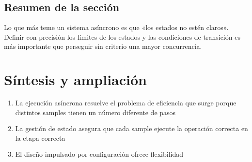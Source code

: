 \documentclass[a4paper]{article}
\begin{document}
\subsection{Resumen de la sección}
Lo que más teme un sistema asíncrono es que «los estados no estén claros». Definir con precisión los límites de los estados y las condiciones de transición es más importante que perseguir sin criterio una mayor concurrencia.

\newpage
\section{Síntesis y ampliación}
\begin{enumerate}
  \item La ejecución asíncrona resuelve el problema de eficiencia que surge porque distintos samples tienen un número diferente de pasos
  \item La gestión de estado asegura que cada sample ejecute la operación correcta en la etapa correcta
  \item El diseño impulsado por configuración ofrece flexibilidad
\end{enumerate}
\end{document}
